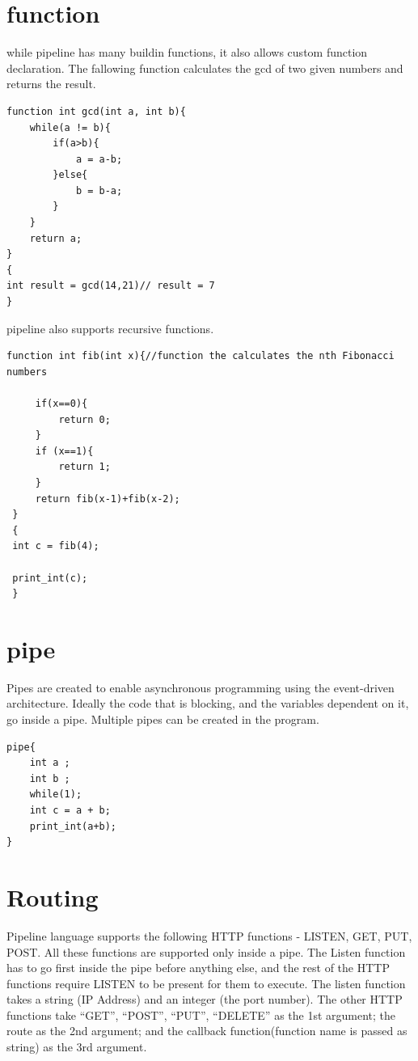 \documentclass[./Report_main.tex]{subfiles}
\begin{document}
\section{function}
while pipeline has many buildin functions, it also allows custom function declaration. The fallowing function calculates the gcd of two given numbers and returns the result.\\
\begin{lstlisting}
function int gcd(int a, int b){
    while(a != b){
        if(a>b){
            a = a-b;
        }else{
            b = b-a;
        }
    }
    return a;
}
{
int result = gcd(14,21)// result = 7
}
\end{lstlisting}
pipeline also supports recursive functions.\\
\begin{lstlisting}
function int fib(int x){//function the calculates the nth Fibonacci numbers
 
     if(x==0){
         return 0;
     }
     if (x==1){
         return 1;
     }
     return fib(x-1)+fib(x-2);
 }
 {
 int c = fib(4);
 
 print_int(c);
 }
\end{lstlisting}
\section{pipe}
Pipes are created to enable asynchronous programming using the event-driven architecture. Ideally the code that is blocking, and the variables dependent on it, go inside a pipe. Multiple pipes can be created in the program.
\begin{lstlisting}
pipe{
	int a ;
	int b ;
	while(1);
	int c = a + b;
	print_int(a+b);
}
\end{lstlisting}

\section{Routing}
Pipeline language supports the following HTTP functions - LISTEN, GET, PUT, POST. All these functions are supported only inside a pipe. The Listen function has to go first inside the pipe before anything else, and the rest of the HTTP functions require LISTEN to be present for them to execute. The listen function takes a string (IP Address) and an integer (the port number). The other HTTP functions take “GET”, “POST”, “PUT”, “DELETE” as the 1st argument; the route as the 2nd argument; and the callback function(function name is passed as string) as the 3rd argument.
\end{document}
